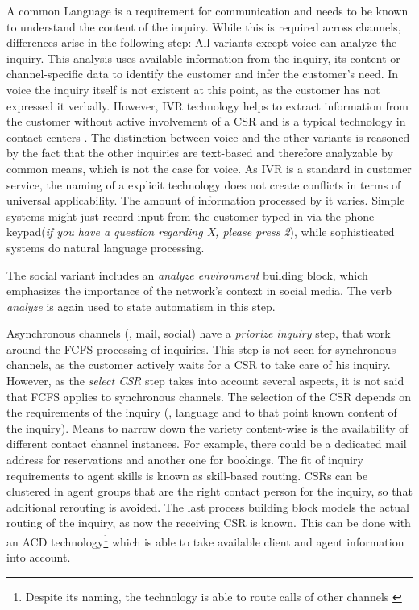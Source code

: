 A common Language is a requirement for communication and needs to be known to understand the content of the inquiry. While this is required across channels, differences arise in the following step: All variants except voice can analyze the inquiry. This analysis uses available information from the inquiry, \ie its content or channel-specific data to identify the customer and infer the customer's need. In voice the inquiry itself is not existent at this point, as the customer has not expressed it verbally. However, \acrfull{IVR} technology helps to extract information from the customer without active involvement of a \acrshort{CSR} and is a typical technology in contact centers \citep{Thomas:2009}. The distinction between voice and the other variants is reasoned by the fact that the other inquiries are text-based and therefore analyzable by common means, which is not the case for voice. As \acrshort{IVR} is a standard in customer service, the naming of a explicit technology does not create conflicts in terms of universal applicability. The amount of information processed by it varies. Simple systems might just record input from the customer typed in via the phone keypad(\textit{if you have  a question regarding X, please press 2}), while sophisticated systems do natural language processing.

The social variant includes an \textit{analyze environment} building block, which emphasizes the importance of the network's context in social media. The verb \textit{analyze} is again used to state automatism in this step. 

Asynchronous channels (\ie, mail, social) have a \textit{priorize inquiry} step, that work around the \acrshort{FCFS} processing of inquiries. This step is not seen for synchronous channels, as the customer actively waits for a \acrshort{CSR} to take care of his inquiry. However, as the \textit{select  \acrshort{CSR}} step takes into account several aspects, it is not said that \acrshort{FCFS} applies to synchronous channels. The selection of the  \acrshort{CSR} depends on the requirements of the inquiry (\ie, language and to that point known content of the inquiry). Means to narrow down the variety content-wise is the availability of different contact channel instances. For example, there could be a dedicated mail address for reservations and another one for bookings. The fit of inquiry requirements to agent skills is known as skill-based routing. \acrshort{CSR}s can be clustered in agent groups that are the right contact person for the inquiry, so that additional rerouting is avoided. The last process building block models the actual routing of the inquiry, as now the receiving  \acrshort{CSR} is known. This can be done with an \acrfull{ACD} technology\footnote{Despite its naming, the technology is able to route calls of other channels \citep{ccn2016} } which is able to take available client and agent information into account.


